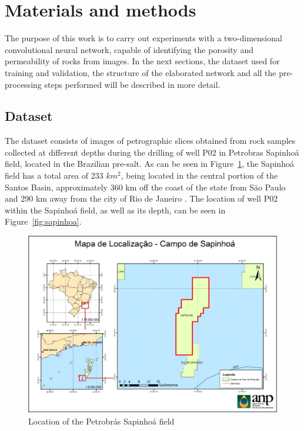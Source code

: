 \documentclass[a4paper,fleqn]{cas-sc}
\begin{document}
\section{Materials and methods}
The purpose of this work is to carry out experiments with a two-dimensional convolutional neural network, capable of identifying the porosity and permeability of rocks from images. In the next sections, the dataset used for training and validation, the structure of the elaborated network and all the pre-processing steps performed will be described in more detail.

\subsection{Dataset}
The dataset consists of images of petrographic slices obtained from rock samples collected at different depths during the drilling of well P02 in Petrobras Sapinhoá field, located in the Brazilian pre-salt. As can be seen in Figure~\ref{fig:campo_sapinhoa}, the Sapinhoá field has a total area of 233 $km^2$, being located in the central portion of the Santos Basin, approximately 360 km off the coast of the state from São Paulo and 290 km away from the city of Rio de Janeiro \cite{sapinhoa_anp}. The location of well P02 within the Sapinhoá field, as well as its depth, can be seen in Figure~\ref{fig:sapinhoa}.

\begin{figure}[h!]
	\caption{Location of the Petrobrás Sapinhoá field}
	\label{fig:campo_sapinhoa}
	\centering%
	\begin{minipage}{0.8\textwidth}
		\includegraphics[width=\textwidth]{images/campo_sapinhoa.png}
	\end{minipage}
\end{figure}
\end{document}
